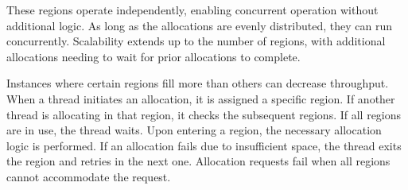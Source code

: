 These regions operate independently, enabling concurrent operation without additional logic. As long as the allocations are evenly distributed, they can run concurrently. Scalability extends up to the number of regions, with additional allocations needing to wait for prior allocations to complete.

Instances where certain regions fill more than others can decrease throughput. When a thread initiates an allocation, it is assigned a specific region. If another thread is allocating in that region, it checks the subsequent regions. If all regions are in use, the thread waits. Upon entering a region, the necessary allocation logic is performed. If an allocation fails due to insufficient space, the thread exits the region and retries in the next one. Allocation requests fail when all regions cannot accommodate the request.

